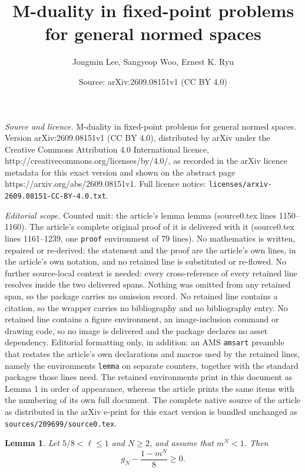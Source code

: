\documentclass[10pt,a4paper]{amsart}
\title{M-duality in fixed-point problems for general normed spaces}
\author{Jongmin Lee, Sangyeop Woo, Ernest K. Ryu}
\date{Source: arXiv:2609.08151v1 (CC BY 4.0)}
\newtheorem{lemma}{Lemma}
\begin{document}
\maketitle

\noindent\emph{Source and licence.} M-duality in fixed-point problems for general normed spaces. Version arXiv:2609.08151v1 (CC BY 4.0), distributed by arXiv under the Creative Commons Attribution 4.0 International licence, http://creativecommons.org/licenses/by/4.0/, as recorded in the arXiv licence metadata for this exact version and shown on the abstract page https://arxiv.org/abs/2609.08151v1. Full licence notice: \texttt{licenses/arxiv-2609.08151-CC-BY-4.0.txt}.\par\smallskip

\noindent\textit{Editorial scope.} Counted unit: the article's lemma lemma (source0.tex lines 1150--1160). The article's complete original proof of it is delivered with it (source0.tex lines 1161--1239, one \texttt{proof} environment of 79 lines). No mathematics is written, repaired or re-derived: the statement and the proof are the article's own lines, in the article's own notation, and no retained line is substituted or re-flowed.  No further source-local context is needed: every cross-reference of every retained line resolves inside the two delivered spans.  Nothing was omitted from any retained span, so the package carries no omission record.  No retained line contains a citation, so the wrapper carries no bibliography and no bibliography entry.  No retained line contains a figure environment, an image-inclusion command or drawing code, so no image is delivered and the package declares no asset dependency.  Editorial formatting only, in addition: an AMS \texttt{amsart} preamble that restates the article's own declarations and macros used by the retained lines, namely the environments \texttt{lemma} on separate counters, together with the standard packages those lines need.  The retained environments print in this document as Lemma 1 in order of appearance, whereas the article prints the same items with the numbering of its own full document.  The complete native source of the article as distributed in the arXiv e-print for this exact version is bundled unchanged as \texttt{sources/209699/source0.tex}.
\begin{lemma}
Let \(5/8<\ell\le 1\) and \(N\ge 2\), and assume that \(m^N<1\). Then
\[
g_N-\frac{1-m^N}{8}
\ge 0.
\]
\end{lemma}
\end{document}
